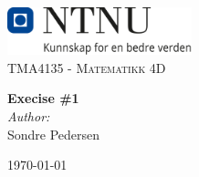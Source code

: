 

\begin{titlepage}
    \vbox{ }
    \vbox{ }
    \begin{center}
        \includegraphics[width=0.40\textwidth]{img/NTNU_logo.png}\\[1cm]
    \textsc{\Large TMA4135 - Matematikk 4D}\\[0.5cm]
    \vbox{ }
    
    { \huge \bfseries Execise \#1}\\[0.4cm]
    
    \large
    \emph{Author:}\\
    Sondre Pedersen
    \vfill
    
    {\large\today}
\end{center}
\end{titlepage}